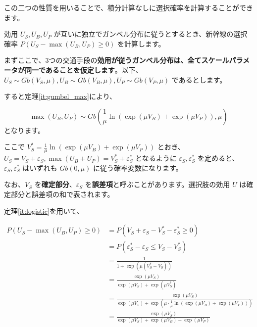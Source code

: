 この二つの性質を用いることで、積分計算なしに選択確率を計算することができます。

効用 $U_S,U_B,U_P$ が互いに独立でガンベル分布に従うとするとき、新幹線の選択確率 $P(U_S - \max(U_B,U_P) \geq 0)$ を計算します。

まずここで、3つの交通手段の\textbf{効用が従うガンベル分布は、全てスケールパラメータが同一であることを仮定します}。以下、$U_S \sim Gb(V_S, \mu), U_B \sim Gb(V_B, \mu), U_P \sim Gb(V_P, \mu)$ であるとします。

すると定理\ref{it:gumbel_max}により、

\begin{equation}
    \max(U_B,U_P) \sim Gb\left(\frac{1}{\mu} \ln\left(\exp(\mu V_B)+\exp(\mu V_P)\right), \mu\right)
\end{equation}
となります。

ここで $V_S^*=\frac{1}{\mu} \ln\left(\exp(\mu V_B)+\exp(\mu V_P)\right)$ とおき、$U_S=V_S+\varepsilon_S, \max(U_B+U_P)=V_S^*+\varepsilon_S^*$ となるように $\varepsilon_S, \varepsilon_S^*$ を定めると、$\varepsilon_S, \varepsilon_S^*$ はいずれも $Gb(0,\mu)$ に従う確率変数になります。

なお、$V_S$ を\textbf{確定部分}、$\varepsilon_S$ を\textbf{誤差項}と呼ぶことがあります。選択肢の効用 $U$ は確定部分と誤差項の和で表されます。

定理\ref{it:logistic}を用いて、

\begin{equation}
    \begin{aligned}
        P(U_S - \max(U_B,U_P) \geq 0)
         & = P(V_S+\varepsilon_S-V_S^*-\varepsilon_S^* \geq 0)                                                             \\
         & = P(\varepsilon_S^*-\varepsilon_S \leq V_S-V_S^*)                                                               \\
         & = \frac{1}{1+\exp(\mu(V_S^*-V_S))}                                                                              \\
         & = \frac{\exp(\mu V_S)}{\exp(\mu V_S)+\exp(\mu V_S^*)}                                                           \\
         & = \frac{\exp(\mu V_S)}{\exp(\mu V_S)+\exp(\mu \cdot \frac{1}{\mu} \ln\left(\exp(\mu V_B)+\exp(\mu V_P)\right))} \\
         & = \frac{\exp(\mu V_S)}{\exp(\mu V_S)+\exp(\mu V_B)+\exp(\mu V_P)}                                               \\
    \end{aligned}
\end{equation}


